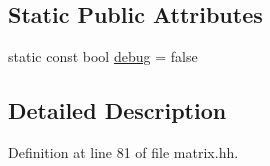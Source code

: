 \subsection*{Static Public Attributes}
\begin{DoxyCompactItemize}
\item 
static const bool \hyperlink{class_rfold_1_1_matrix_ad9a9131f0d234138b757dbe76fe62b28}{debug} = false
\end{DoxyCompactItemize}


\subsection{Detailed Description}


Definition at line 81 of file matrix.\+hh.



